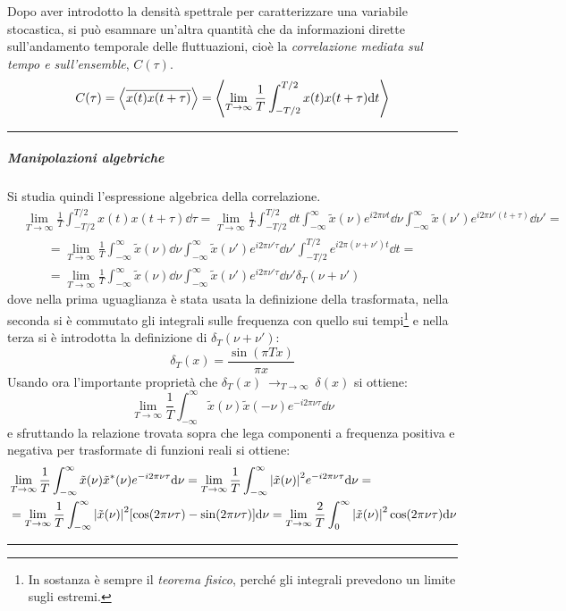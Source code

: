 Dopo aver introdotto la densità spettrale per caratterizzare una variabile stocastica, si può esamnare un'altra quantità che da informazioni dirette sull'andamento temporale delle fluttuazioni, cioè la \textit{correlazione mediata sul tempo e sull'ensemble}, $ C(\tau) $.\vspace*{-10pt}
\[ C(\tau) = \expval{\overline{x(t)x(t+\tau)}} = \expval{\lim\limits_{T \rightarrow \infty} \frac{1}{T} \int_{-T/2}^{T/2} x(t)x(t+\tau) \dd t} \]

\vspace*{-3pt}
\hrule
\vspace*{-3pt}
\subparagraph{Manipolazioni algebriche} Si studia quindi l'espressione algebrica della correlazione.
\begin{align*}
&\lim\limits_{T \rightarrow \infty} \frac{1}{T} \int_{-T/2}^{T/2} x(t)x(t+\tau) \dd \tau = \lim\limits_{T \rightarrow \infty} \frac{1}{T} \int_{-T/2}^{T/2} \dd t \int_{-\infty}^{\infty} \tilde{x}(\nu) e^{i 2\pi \nu t} \dd \nu \int_{-\infty}^{\infty} \tilde{x}(\nu') e^{i 2\pi \nu' (t + \tau)} \dd \nu'  =\\
&\qquad = \lim\limits_{T \rightarrow \infty} \frac{1}{T} \int_{-\infty}^{\infty} \tilde{x}(\nu) \dd \nu \int_{-\infty}^{\infty} \tilde{x}(\nu') e^{i 2\pi \nu' \tau} \dd \nu' \int_{-T/2}^{T/2} e ^{i 2\pi (\nu + \nu') t}  \dd t  =\\
&\qquad = \lim\limits_{T \rightarrow \infty} \frac{1}{T} \int_{-\infty}^{\infty} \tilde{x}(\nu) \dd \nu \int_{-\infty}^{\infty} \tilde{x}(\nu') e^{i 2\pi \nu' \tau} \dd \nu' \delta_T(\nu + \nu')
\end{align*}
dove nella prima uguaglianza è stata usata la definizione della trasformata, nella seconda si è commutato gli integrali sulle frequenza con quello sui tempi\footnote{In sostanza è sempre il \textit{teorema fisico}, perché gli integrali prevedono un limite sugli estremi.} e nella terza si è introdotta la definizione di $ \delta_T(\nu + \nu') $:
\[ \delta_T(x) = \frac{\sin(\pi T x)}{\pi x} \]
Usando ora l'importante proprietà che $ \delta_T(x) ~\rightarrow_{T \rightarrow \infty}~ \delta(x) $ si ottiene:
\[ \lim\limits_{T \rightarrow \infty} \frac{1}{T} \int_{-\infty}^{\infty} \tilde{x}(\nu) \tilde{x}(- \nu) e^{- i 2\pi \nu \tau} \dd \nu \]
e sfruttando la relazione trovata sopra che lega componenti a frequenza positiva e negativa per trasformate di funzioni reali si ottiene:
\begin{align*}
&\lim\limits_{T \rightarrow \infty} \frac{1}{T} \int_{-\infty}^{\infty} \tilde{x}(\nu) \tilde{x}^\ast(\nu) e^{- i 2\pi \nu \tau} \dd \nu = \lim\limits_{T \rightarrow \infty} \frac{1}{T} \int_{-\infty}^{\infty} \abs{\tilde{x}(\nu)}^2 e^{- i 2\pi \nu \tau} \dd \nu =\\
&=  \lim\limits_{T \rightarrow \infty} \frac{1}{T} \int_{-\infty}^{\infty} \abs{\tilde{x}(\nu)}^2 [\cos( 2\pi \nu  \tau) - \sin( 2\pi \nu \tau)] \dd \nu 
= \lim\limits_{T \rightarrow \infty} \frac{2}{T} \int_{0}^{\infty} \abs{\tilde{x}(\nu)}^2 \cos( 2\pi \nu \tau) \dd \nu  
\end{align*}
\vspace*{-3pt}
\hrule
\vspace*{8pt}

